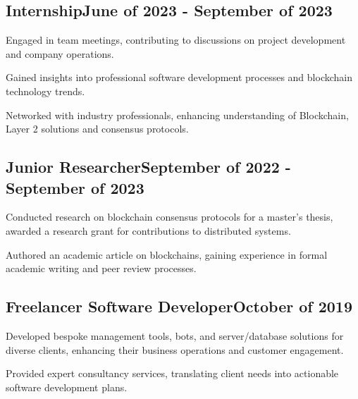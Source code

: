 \documentclass[a4paper,12pt]{article}
\begin{document}

\vspace*{6pt}
\subsection{{Internship}\hfill June of 2023 - September of 2023}
\begin{zitemize}
    \item Engaged in team meetings, contributing to discussions on project development and company operations.
    \item Gained insights into professional software development processes and blockchain technology trends.
    \item Networked with industry professionals, enhancing understanding of Blockchain, Layer 2 solutions and consensus protocols.
\end{zitemize}

\vspace*{1pt} 
\subsection{{Junior Researcher}\hfill September of 2022 - September of 2023}
\begin{zitemize}
    \item Conducted research on blockchain consensus protocols for a master's thesis, awarded a research grant for contributions to distributed systems.
    \item Authored an academic article on blockchains, gaining experience in formal academic writing and peer review processes.
\end{zitemize}

\vspace*{1pt} 
\subsection{{Freelancer Software Developer}\hfill October of 2019}
\begin{zitemize}
\item Developed bespoke management tools, bots, and server/database solutions for diverse clients, enhancing their business operations and customer engagement.
\item Provided expert consultancy services, translating client needs into actionable software development plans.
\end{zitemize}
\end{document}
